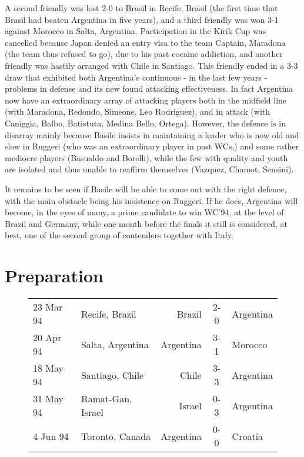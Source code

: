 A second friendly was lost 2-0 to Brasil in Recife, Brasil (the first time that
Brasil had beaten Argentina in five years), and a third friendly was won 3-1
against Morocco in Salta, Argentina.  Participation in the Kirik Cup was 
cancelled because Japan denied an entry visa to the team Captain, Maradona (the
team thus refused to go), due to his past cocaine addiction, and another  
friendly was hastily arranged with Chile in Santiago. This friendly ended in a 
3-3 draw that exhibited both Argentina's continuous - in the last few years - 
problems in defense and its new found attacking effectiveness. In fact 
Argentina now have an extraordinary array of attacking players both in the 
midfield line (with Maradona, Redondo, Simeone, Leo Rodriguez), and in attack 
(with Caniggia, Balbo, Batistuta, Medina Bello, Ortega). However, the defence
is in disarray mainly because Basile insists in maintaining a leader who is now
old and slow in Ruggeri (who was an extraordinary player in past WCs,) and some
rather mediocre players (Basualdo and Borelli), while the few with quality and 
youth are isolated and thus unable to reaffirm themselves (Vazquez, Chamot, 
Sensini).

It remains to be seen if Basile will be able to come out with the right 
defence, with the main obstacle being his insistence on Ruggeri. If he does, 
Argentina will become, in the eyes of many, a prime candidate to win WC'94, at 
the level of Brazil and Germany, while one month before the finals it still is 
considered, at best, one of the second group of contenders together with Italy.

\section{Preparation}
\begin{figure}[H]
\begin{tabular}{l lr c l}
23 Mar 94 & Recife, Brazil & Brazil & 2-0 & Argentina \\
20 Apr 94 & Salta, Argentina & Argentina & 3-1 & Morocco \\
18 May 94 & Santiago, Chile & Chile & 3-3 & Argentina \\
31 May 94 & Ramat-Gan, Israel & Israel & 0-3 & Argentina \\
4 Jun 94 & Toronto, Canada & Argentina & 0-0 & Croatia \\ 
\end{tabular}
\end{figure}
